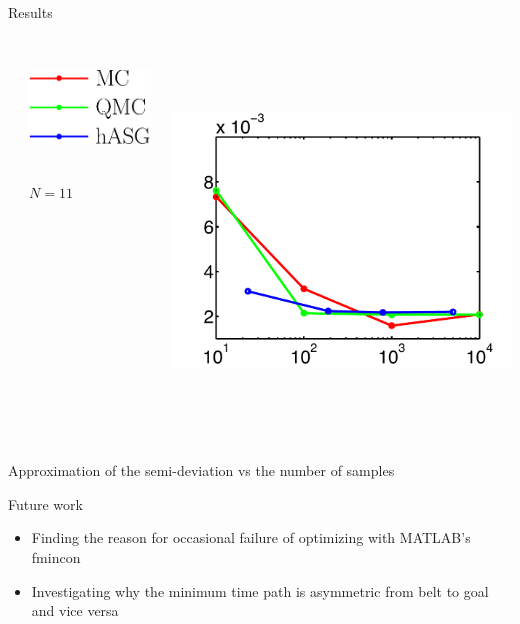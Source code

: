 \documentclass[final]{beamer}
\newcommand{\E}{\ensuremath{\mathbb{E}} } %
\newcommand{\bx}{\ensuremath{\mathbf{x}}} %
\begin{document}
\begin{frame}{}
{\begin{columns}[t]
\begin{column}{.30\linewidth}
\begin{block}{\centering Results}
\begin{columns}[T]
\begin{column}{12cm}{}
\end{column}
\begin{column}{4cm}{}
\vspace{2cm}
\centering\includegraphics[height=3cm,width=5cm]{figures/legend2}\\
\vspace{1em}
\raggedright{\footnotesize{$N=11$}}
\end{column}
\begin{column}{14cm}{}
\includegraphics[height=10cm, width = 14cm]{figures/semidev11errors}\\
\end{column}
\end{columns}
\vspace{0.5em}
\centering\scriptsize{Approximation of the semi-deviation vs the number of samples}
\end{block}



                
                
\begin{block}{\centering Future work}
\begin{itemize}
	\item Finding the reason for occasional failure of optimizing with MATLAB's fmincon
	\item Investigating why the minimum time path is asymmetric from belt to goal and vice versa
\end{itemize}
\end{block}
                

\end{column}
\end{columns}}
\end{frame}
\end{document}
